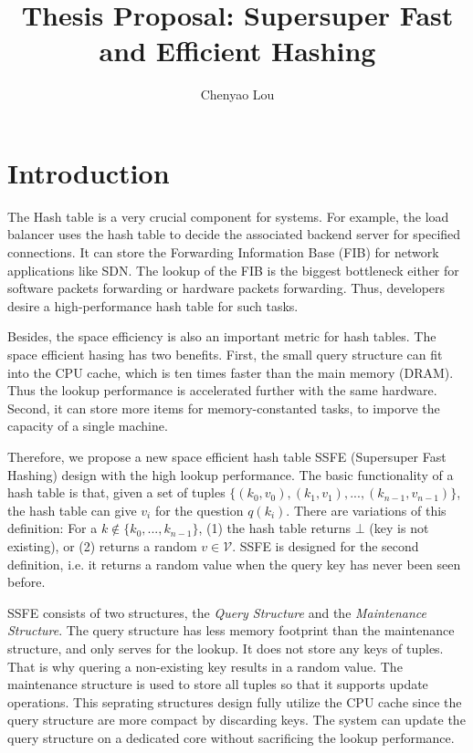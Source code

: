 \documentclass{article}
\title{Thesis Proposal: Supersuper Fast and Efficient Hashing}
\author{Chenyao Lou}
\date{}
\begin{document}
\maketitle

\newcommand{\qs}{\textit{Query Structure}\xspace}
\newcommand{\ms}{\textit{Maintenance Structure}\xspace}

\section{Introduction}


The Hash table is a very crucial component for systems. For example, the load balancer uses the hash table to decide the associated backend server for specified connections. It can store the Forwarding Information Base (FIB) for network applications \cite{zhou2013scalable} like SDN. The lookup of the FIB is the biggest bottleneck either for software packets forwarding or hardware packets forwarding. Thus, developers desire a high-performance hash table for such tasks.

Besides, the space efficiency is also an important metric for hash tables. The space efficient hasing has two benefits. First, the small query structure can fit into the CPU cache, which is ten times faster than the main memory (DRAM). Thus the lookup performance is accelerated further with the same hardware. Second, it can store more items for memory-constanted tasks, to imporve the capacity of a single machine.


Therefore, we propose a new space efficient hash table SSFE (Supersuper Fast Hashing) design with the high lookup performance. The basic functionality of a hash table is that, given a set of tuples $\{(k_0, v_0), (k_1, v_1), ..., (k_{n-1}, v_{n-1})\}$, the hash table can give $v_i$ for the question $q(k_i)$. There are variations of this definition: For a $k \not\in \{k_0, ..., k_{n-1}\}$, (1) the hash table returns $\bot$ (key is not existing), or (2) returns a random $v \in \mathcal{V}$. SSFE is designed for the second definition, i.e. it returns a random value when the query key has never been seen before.


SSFE consists of two structures, the \textit{Query Structure} and the \textit{Maintenance Structure}. The query structure has less memory footprint than the maintenance structure, and only serves for the lookup. It does not store any keys of tuples. That is why quering a non-existing key results in a random value. The maintenance structure is used to store all tuples so that it supports update operations. This seprating structures design fully utilize the CPU cache since the query structure are more compact by discarding keys. The system can update the query structure on a dedicated core without sacrificing the lookup performance.
\end{document}
